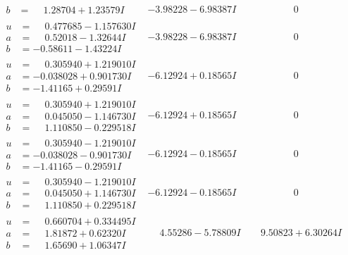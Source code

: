 \documentclass[1p]{elsarticle_modified}
\theoremstyle{definition}
\begin{document}
$$\begin{array}{c|c|c}
\begin{aligned}
b &= \phantom{-}1.28704 + 1.23579 I\end{aligned}
 & -3.98228 - 6.98387 I & \phantom{-0.000000 } 0 \\ \hline\begin{aligned}
u &= \phantom{-}0.477685 - 1.157630 I \\
a &= \phantom{-}0.52018 - 1.32644 I \\
b &= -0.58611 - 1.43224 I\end{aligned}
 & -3.98228 - 6.98387 I & \phantom{-0.000000 } 0 \\ \hline\begin{aligned}
u &= \phantom{-}0.305940 + 1.219010 I \\
a &= -0.038028 + 0.901730 I \\
b &= -1.41165 + 0.29591 I\end{aligned}
 & -6.12924 + 0.18565 I & \phantom{-0.000000 } 0 \\ \hline\begin{aligned}
u &= \phantom{-}0.305940 + 1.219010 I \\
a &= \phantom{-}0.045050 - 1.146730 I \\
b &= \phantom{-}1.110850 - 0.229518 I\end{aligned}
 & -6.12924 + 0.18565 I & \phantom{-0.000000 } 0 \\ \hline\begin{aligned}
u &= \phantom{-}0.305940 - 1.219010 I \\
a &= -0.038028 - 0.901730 I \\
b &= -1.41165 - 0.29591 I\end{aligned}
 & -6.12924 - 0.18565 I & \phantom{-0.000000 } 0 \\ \hline\begin{aligned}
u &= \phantom{-}0.305940 - 1.219010 I \\
a &= \phantom{-}0.045050 + 1.146730 I \\
b &= \phantom{-}1.110850 + 0.229518 I\end{aligned}
 & -6.12924 - 0.18565 I & \phantom{-0.000000 } 0 \\ \hline\begin{aligned}
u &= \phantom{-}0.660704 + 0.334495 I \\
a &= \phantom{-}1.81872 + 0.62320 I \\
b &= \phantom{-}1.65690 + 1.06347 I\end{aligned}
 & \phantom{-}4.55286 - 5.78809 I & \phantom{-}9.50823 + 6.30264 I \\ \hline\begin{aligned}

\end{aligned}
\end{array}$$
\end{document}

